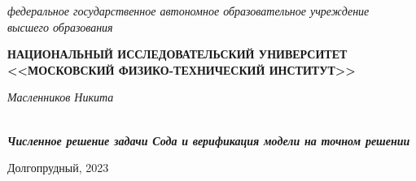 \begin{titlepage}
\begin{center}
	\textit{федеральное государственное автономное образовательное учреждение \\
		высшего образования}
	\vspace{0.5ex} %
	
	\textbf{НАЦИОНАЛЬНЫЙ ИССЛЕДОВАТЕЛЬСКИЙ УНИВЕРСИТЕТ \\ <<МОСКОВСКИЙ ФИЗИКО-ТЕХНИЧЕСКИЙ ИНСТИТУТ>>}
\end{center}%

\vspace{13ex}
\begin{flushright}%
	\noindent%
	\textit{Масленников Никита}\\
	\\
\end{flushright}
\begin{center}
	\vspace{13ex}
	\vspace{1ex}
	
	\textbf{\textit{Численное решение задачи Сода и верификация модели на точном решении}}
	
	\vfill %
	Долгопрудный, 2023
\end{center}
\end{titlepage}